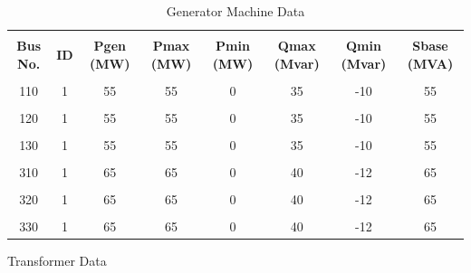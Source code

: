 \documentclass[paper=a4, fontsize=11pt]{article}
\begin{document}
\begin{landscape}

\begin{table}[t]
\caption{Generator Machine Data}
\centering
\begin{tabular}{|c|c|c|c|c|c|c|c|}
\hline &&&&&&&\\[-1em]
\textbf{Bus No.} & \textbf{ID} & \textbf{Pgen (MW)} & \textbf{Pmax (MW)} & \textbf{Pmin (MW)} & \textbf{Qmax (Mvar)} & \textbf{Qmin (Mvar)} & \textbf{Sbase (MVA)} \\ \hline &&&&&&&\\[-1em]
110              & 1           & 55                 & 55                 & 0                  & 35                   & -10                  & 55                   \\ \hline &&&&&&&\\[-1em]
120              & 1           & 55                 & 55                 & 0                  & 35                   & -10                  & 55                   \\ \hline &&&&&&&\\[-1em]
130              & 1           & 55                 & 55                 & 0                  & 35                   & -10                  & 55                   \\ \hline &&&&&&&\\[-1em]
310              & 1           & 65                 & 65                 & 0                  & 40                   & -12                  & 65                   \\ \hline &&&&&&&\\[-1em]
320              & 1           & 65                 & 65                 & 0                  & 40                   & -12                  & 65                   \\ \hline &&&&&&&\\[-1em]
330              & 1           & 65                 & 65                 & 0                  & 40                   & -12                  & 65                   \\ \hline
\end{tabular}
\end{table}

\begin{table}[b]
\caption{Transformer Data}
\centering


\end{table}
\end{landscape}
\end{document}
